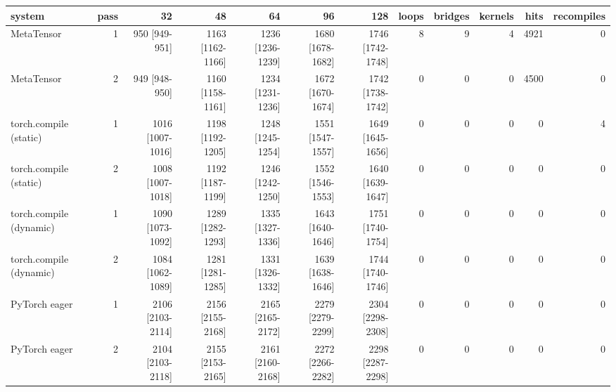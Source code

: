 \begin{tabular}{lrrrrrrrrrrr}
\toprule
system & pass & 32 & 48 & 64 & 96 & 128 & loops & bridges & kernels & hits & recompiles \\
\midrule
MetaTensor & 1 & 950 [949-951] & 1163 [1162-1166] & 1236 [1236-1239] & 1680 [1678-1682] & 1746 [1742-1748] & 8 & 9 & 4 & 4921 & 0 \\
MetaTensor & 2 & 949 [948-950] & 1160 [1158-1161] & 1234 [1231-1236] & 1672 [1670-1674] & 1742 [1738-1742] & 0 & 0 & 0 & 4500 & 0 \\
torch.compile (static) & 1 & 1016 [1007-1016] & 1198 [1192-1205] & 1248 [1245-1254] & 1551 [1547-1557] & 1649 [1645-1656] & 0 & 0 & 0 & 0 & 4 \\
torch.compile (static) & 2 & 1008 [1007-1018] & 1192 [1187-1199] & 1246 [1242-1250] & 1552 [1546-1553] & 1640 [1639-1647] & 0 & 0 & 0 & 0 & 0 \\
torch.compile (dynamic) & 1 & 1090 [1073-1092] & 1289 [1282-1293] & 1335 [1327-1336] & 1643 [1640-1646] & 1751 [1740-1754] & 0 & 0 & 0 & 0 & 0 \\
torch.compile (dynamic) & 2 & 1084 [1062-1089] & 1281 [1281-1285] & 1331 [1326-1332] & 1639 [1638-1646] & 1744 [1740-1746] & 0 & 0 & 0 & 0 & 0 \\
PyTorch eager & 1 & 2106 [2103-2114] & 2156 [2155-2168] & 2165 [2165-2172] & 2279 [2279-2299] & 2304 [2298-2308] & 0 & 0 & 0 & 0 & 0 \\
PyTorch eager & 2 & 2104 [2103-2118] & 2155 [2153-2165] & 2161 [2160-2168] & 2272 [2266-2282] & 2298 [2287-2298] & 0 & 0 & 0 & 0 & 0 \\
\bottomrule
\end{tabular}

